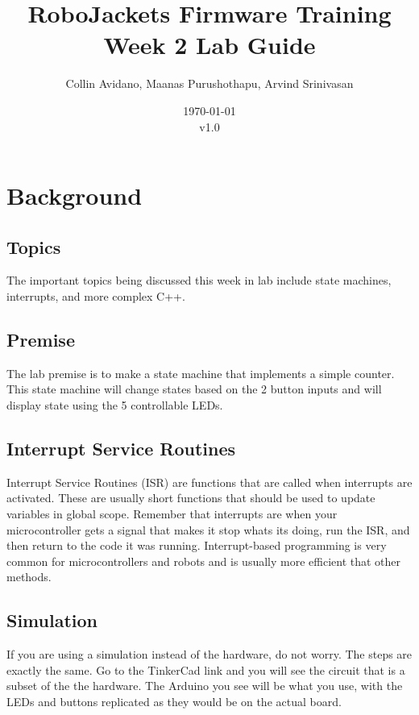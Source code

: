 \documentclass{article}
\title{RoboJackets Firmware Training Week 2 Lab Guide}
\author{Collin Avidano, Maanas Purushothapu, Arvind Srinivasan}
\date{\today\\v1.0}
\begin{document}
\maketitle{}
\setcounter{tocdepth}{2}
\tableofcontents
\pagebreak


\section{Background}
    \subsection{Topics}
        The important topics being discussed this week in lab include state machines, interrupts, and more complex C++.
    \subsection{Premise}
        The lab premise is to make a state machine that implements a simple counter. This state machine will change states based on the 2 button inputs and will display state using the 5 controllable LEDs.
    \subsection{Interrupt Service Routines}
        Interrupt Service Routines (ISR) are functions that are called when interrupts are activated. These are usually short functions that should be used to update variables in global scope. Remember that interrupts are when your microcontroller gets a signal that makes it stop whats its doing, run the ISR, and then return to the code it was running. Interrupt-based programming is very common for microcontrollers and robots and is usually more efficient that other methods.
        
    \subsection{Simulation}
        If you are using a simulation instead of the hardware, do not worry.  The steps are exactly the same.  Go to the TinkerCad link and you will see the circuit that is a subset of the the hardware. The Arduino you see will be what you use, with the LEDs and buttons replicated as they would be on the actual board. 
        
\end{document}
